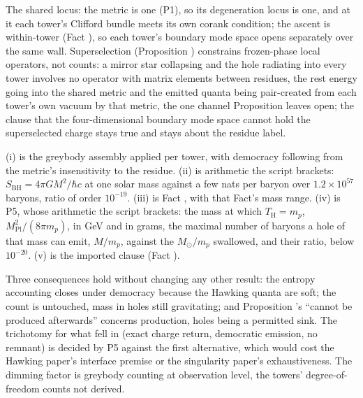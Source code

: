 The shared locus: the metric is one (P1), so its degeneration locus is one, and at it each tower's Clifford bundle meets its own corank condition; the ascent is within-tower (Fact ), so each tower's boundary mode space opens separately over the same wall. Superselection (Proposition ) constrains frozen-phase local operators, not counts: a mirror star collapsing and the hole radiating into every tower involves no operator with matrix elements between residues, the rest energy going into the shared metric and the emitted quanta being pair-created from each tower's own vacuum by that metric, the one channel Proposition  leaves open; the clause that the four-dimensional boundary mode space cannot hold the superselected charge stays true and stays about the residue label.

(i) is the greybody assembly applied per tower, with democracy following from the metric's insensitivity to the residue. (ii) is arithmetic the script brackets: $S_{\mathrm{BH}} = 4\pi G M^{2}/\hbar c$ at one solar mass against a few nats per baryon over $1.2 \times 10^{57}$ baryons, ratio of order $10^{-19}$. (iii) is Fact , with that Fact's mass range. (iv) is P5, whose arithmetic the script brackets: the mass at which $T_{\mathrm{H}} = m_{p}$, $M_{\mathrm{Pl}}^{2}/(8\pi m_{p})$, in GeV and in grams, the maximal number of baryons a hole of that mass can emit, $M/m_{p}$, against the $M_{\odot}/m_{p}$ swallowed, and their ratio, below $10^{-20}$. (v) is the imported clause (Fact ).

Three consequences hold without changing any other result: the entropy accounting closes under democracy because the Hawking quanta are soft; the count is untouched, mass in holes still gravitating; and Proposition 's ``cannot be produced afterwards'' concerns production, holes being a permitted sink. The trichotomy for what fell in (exact charge return, democratic emission, no remnant) is decided by P5 against the first alternative, which would cost the Hawking paper's interface premise or the singularity paper's exhaustiveness. The dimming factor is greybody counting at observation level, the towers' degree-of-freedom counts not derived.
